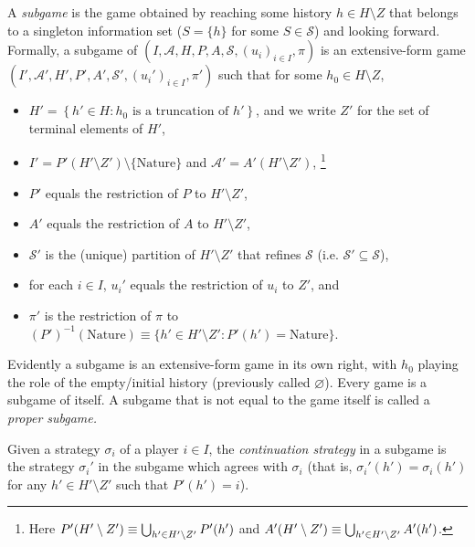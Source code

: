 \documentclass[11pt,letterpaper,reqno,oneside]{book}
\begin{document}
A \emph{subgame} is the game obtained by reaching some history $h \in H \setminus Z$ that belongs to a singleton information set ($S = \{h\}$ for some $S \in \mathcal{S}$) and looking forward. Formally, a subgame of $(I,\mathcal{A},H,P,A,\mathcal{S},(u_i)_{i \in I},\pi)$ is an extensive-form game $(I',\mathcal{A}',H',P',A',\mathcal{S}',(u_i')_{i \in I},\pi')$ such that for some $h_0 \in H \setminus Z$,
%
\begin{itemize}

	\item $H' = \left\{ h' \in H : \text{$h_0$ is a truncation of $h'$} \right\}$, and we write $Z'$ for the set of terminal elements of $H'$,

	\item $I' = P'\left( H' \setminus Z' \right) \setminus \{\text{Nature}\}$ and $\mathcal{A'} = A'\left( H' \setminus Z' \right)$,%
		\footnote{Here $P'\left( H' \setminus Z' \right) \equiv \Union_{h' \in H' \setminus Z'} P'(h')$ and $A'\left( H' \setminus Z' \right) \equiv \Union_{h' \in H' \setminus Z'} A'(h')$.}

	\item $P'$ equals the restriction of $P$ to $H' \setminus Z'$,

	\item $A'$ equals the restriction of $A$ to $H' \setminus Z'$,

	\item $\mathcal{S}'$ is the (unique) partition of $H' \setminus Z'$ that refines $\mathcal{S}$ (i.e. $\mathcal{S}' \subseteq \mathcal{S}$),

	\item for each $i \in I$, $u_i'$ equals the restriction of $u_i$ to $Z'$, and

	\item $\pi'$ is the restriction of $\pi$ to $(P')^{-1}(\text{Nature}) \equiv \{ h' \in H' \setminus Z' : P'(h') = \text{Nature} \}$.

\end{itemize}
%
Evidently a subgame is an extensive-form game in its own right, with $h_0$ playing the role of the empty/initial history (previously called $\varnothing$). Every game is a subgame of itself. A subgame that is not equal to the game itself is called a \emph{proper subgame.}

Given a strategy $\sigma_i$ of a player $i \in I$, the \emph{continuation strategy} in a subgame is the strategy $\sigma_i'$ in the subgame which agrees with $\sigma_i$ (that is, $\sigma_i'(h') = \sigma_i(h')$ for any $h' \in H' \setminus Z'$ such that $P'(h') = i$).
\end{document}
